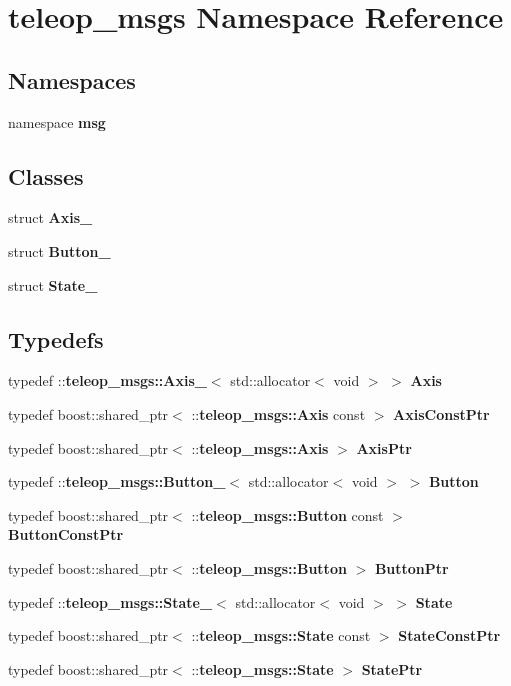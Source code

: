 \section{teleop\_\-msgs Namespace Reference}
\label{namespaceteleop__msgs}
\subsection*{Namespaces}
\begin{DoxyCompactItemize}
\item 
namespace {\bf msg}
\end{DoxyCompactItemize}
\subsection*{Classes}
\begin{DoxyCompactItemize}
\item 
struct {\bf Axis\_\-}
\item 
struct {\bf Button\_\-}
\item 
struct {\bf State\_\-}
\end{DoxyCompactItemize}
\subsection*{Typedefs}
\begin{DoxyCompactItemize}
\item 
typedef ::{\bf teleop\_\-msgs::Axis\_\-}$<$ std::allocator$<$ void $>$ $>$ {\bf Axis}
\item 
typedef boost::shared\_\-ptr$<$ ::{\bf teleop\_\-msgs::Axis} const  $>$ {\bf AxisConstPtr}
\item 
typedef boost::shared\_\-ptr$<$ ::{\bf teleop\_\-msgs::Axis} $>$ {\bf AxisPtr}
\item 
typedef ::{\bf teleop\_\-msgs::Button\_\-}$<$ std::allocator$<$ void $>$ $>$ {\bf Button}
\item 
typedef boost::shared\_\-ptr$<$ ::{\bf teleop\_\-msgs::Button} const  $>$ {\bf ButtonConstPtr}
\item 
typedef boost::shared\_\-ptr$<$ ::{\bf teleop\_\-msgs::Button} $>$ {\bf ButtonPtr}
\item 
typedef ::{\bf teleop\_\-msgs::State\_\-}$<$ std::allocator$<$ void $>$ $>$ {\bf State}
\item 
typedef boost::shared\_\-ptr$<$ ::{\bf teleop\_\-msgs::State} const  $>$ {\bf StateConstPtr}
\item 
typedef boost::shared\_\-ptr$<$ ::{\bf teleop\_\-msgs::State} $>$ {\bf StatePtr}
\end{DoxyCompactItemize}
